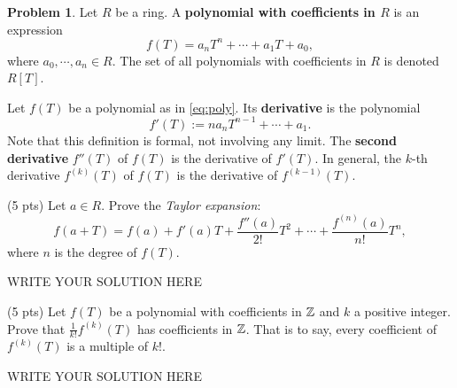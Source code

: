 \documentclass[11pt]{article}
\theoremstyle{plain}
\theoremstyle{definition}
\newtheorem{problem}{Problem}
\theoremstyle{remark}
\numberwithin{equation}{problem}
\begin{document}
\begin{problem}
	Let $R$ be a ring. A \textbf{polynomial with coefficients in $R$} is an expression 
	\begin{equation}\label{eq:poly}
		f(T) = a_nT^n + \cdots + a_1T + a_0,
	\end{equation}
	where $a_0,\cdots,a_n\in R$. 
	The set of all polynomials with coefficients in $R$ is denoted $R[T]$. 

	Let $f(T)$ be a polynomial as in \cref{eq:poly}. Its \textbf{derivative} is the polynomial
	\[
		f'(T) := na_nT^{n-1} + \cdots + a_1.
	\]
	Note that this definition is formal, not involving any limit. The \textbf{second derivative} $f''(T)$ of $f(T)$ is the derivative of $f'(T)$. In general, the $k$-th derivative $f^{(k)}(T)$ of $f(T)$ is the derivative of $f^{(k-1)}(T)$.
	\begin{listinprob}
		\item (5 pts) Let $a\in R$. Prove the \emph{Taylor expansion}:
		\[
			f(a+T) = f(a) + f'(a)T + \frac{f''(a)}{2!}T^2 + \cdots + \frac{f^{(n)}(a)}{n!}T^n,
		\]
		where $n$ is the degree of $f(T)$.
\begin{solution} %
WRITE YOUR SOLUTION HERE
\end{solution}\clearpage %

		\item (5 pts) Let $f(T)$ be a polynomial with coefficients in $\mathbb{Z}$ and $k$ a positive integer. Prove that $\frac{1}{k!}f^{(k)}(T)$ has coefficients in $\mathbb{Z}$. That is to say, every coefficient of $f^{(k)}(T)$ is a multiple of $k!$.
	\end{listinprob}
\end{problem}
\begin{solution} %
WRITE YOUR SOLUTION HERE
\end{solution}\clearpage %
\end{document}
